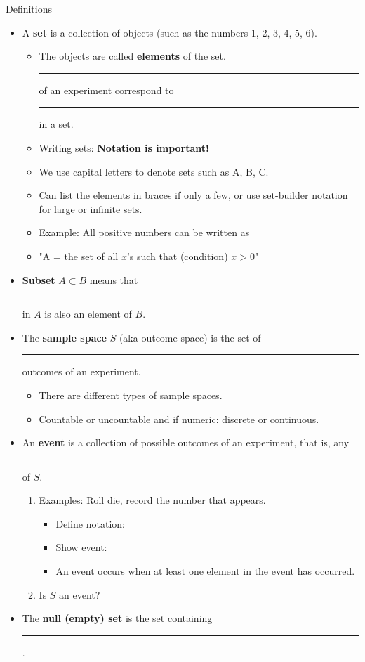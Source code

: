 \documentclass{article}
\newcommand{\blankul}[1]{\rule[-1.5mm]{#1}{0.15mm}}	%
\begin{document}
Definitions\bigskip
\begin{itemize}
    \item A \textbf{set} is a collection of objects (such as the numbers 1, 2, 3, 4, 5, 6).
    \begin{itemize}
        \item The objects are called \textbf{elements} of the set. \blankul{2cm} of an experiment correspond to \blankul{2cm} in a set.
	\item Writing sets: \textbf{Notation is important!}
        \item[] We use capital letters to denote sets such as A, B, C.
        \item[] Can list the elements in braces if only a few, or use set-builder notation for large or infinite sets.
        \item Example: All positive numbers can be written as
        \item[] "A = the set of all $x$'s such that (condition) $x > 0$"\vspace{30pt}
    \end{itemize}
    \item \textbf{Subset} $A \subset B$ means that \blankul{3cm} in $A$ is also an element of $B$.\bigskip
    \item The \textbf{sample space} $S$ (aka outcome space) is the set of \blankul{2cm} outcomes of an experiment.
    \begin{itemize}
        \item There are different types of sample spaces.
        \item Countable or uncountable and if numeric: discrete or continuous.
    \end{itemize}
    \item An \textbf{event} is a collection of possible outcomes of an experiment, that is, any \blankul{1.5cm} of $S$. 
    \begin{enumerate}
        \item Examples: Roll die, record the number that appears.
        \begin{itemize}
            \item Define notation:
            \item Show event:\\
            \item[] An event occurs when at least one element in the event has occurred.
        \end{itemize}
        \item Is $S$ an event?
    \end{enumerate}
    \item The \textbf{null (empty) set} is the set containing \blankul{2.5cm}. 
 \end{itemize}\bigskip
\end{document}
